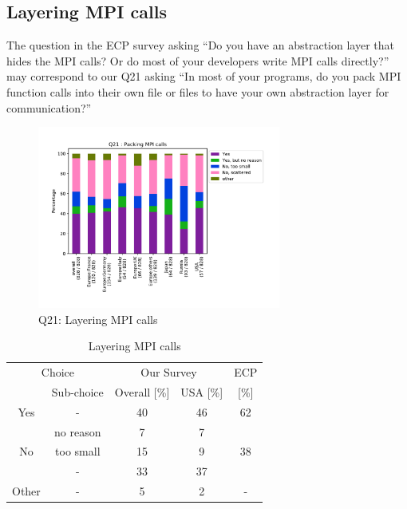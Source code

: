 \documentclass[conference,10pt,letterpaper]{IEEEtran}
\begin{document}
\subsection{Layering MPI calls}

The question in the ECP survey asking ``Do you have an abstraction
layer that hides the MPI calls? Or do most of your developers write
MPI calls directly?'' may correspond to our Q21 asking ``In most of
your programs, do you pack MPI function calls into their own file or
files to have your own abstraction layer for communication?'' 

\begin{figure}[htb]
\begin{center}
\includegraphics[width=8cm]{Figs/Q21-enlarged.pdf}
\caption{Q21: Layering MPI calls}
\label{fig:layering-mpi-calls}
\end{center}
\end{figure}

\begin{table}[htb]%
\begin{center}%
\caption{Layering MPI calls}\label{tab:layering-mpi-calls}%
\begin{tabular}{c|c||c|c||c}%
\hline%
\multicolumn{2}{c||}{Choice} & \multicolumn{2}{c||}{Our Survey} & ECP \\
\cline{2-5}%
 & Sub-choice & Overall [\%] & USA [\%] & [\%] \\
\hline%
\hline%
Yes & - & 40 & 46 & 62 \\
& no reason & 7 & 7 & \\
\hline%
No & too small & 15 & 9 & 38 \\
& - & 33 & 37 &  \\
\hline%
Other & - & 5 & 2 & - \\
\hline%
\end{tabular}%
\end{center}%
\end{table}%
\end{document}
